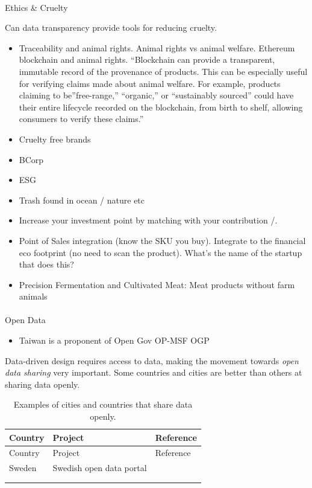\documentclass[
  letterpaper,
  DIV=11,
  numbers=noendperiod]{scrartcl}
\makeatletter
\let\oldparagraph\paragraph
\renewcommand{\paragraph}{
    \@ifstar
      \xxxParagraphStar
      \xxxParagraphNoStar
  }
\newcommand{\xxxParagraphStar}[1]{\oldparagraph*{#1}\mbox{}}
\newcommand{\xxxParagraphNoStar}[1]{\oldparagraph{#1}\mbox{}}
\providecommand{\tightlist}{%
  \setlength{\itemsep}{0pt}\setlength{\parskip}{0pt}}\usepackage{longtable,booktabs,array}
\makeatother
\begin{document}
\paragraph{Ethics \& Cruelty}\label{ethics-cruelty}

Can data transparency provide tools for reducing cruelty.

\begin{itemize}
\item
  Traceability and animal rights. Animal rights vs animal welfare.
  Ethereum blockchain and animal rights. ``Blockchain can provide a
  transparent, immutable record of the provenance of products. This can
  be especially useful for verifying claims made about animal welfare.
  For example, products claiming to be''free-range,'' ``organic,'' or
  ``sustainably sourced'' could have their entire lifecycle recorded on
  the blockchain, from birth to shelf, allowing consumers to verify
  these claims.''
\item
  Cruelty free brands
\item
  BCorp
\item
  ESG
\item
  Trash found in ocean / nature etc
\item
  Increase your investment point by matching with your contribution /.
\item
  Point of Sales integration (know the SKU you buy). Integrate to the
  financial eco footprint (no need to scan the product). What's the name
  of the startup that does this?
\item
  Precision Fermentation and Cultivated Meat: Meat products without farm
  animals
\end{itemize}

\paragraph{Open Data}\label{open-data}

\begin{itemize}
\tightlist
\item
  Taiwan is a proponent of Open Gov OP-MSF OGP
  \citep{opengovernmentpartnershipOGPParticipationCoCreation2021, labTaiwanTakesActions2021}
\end{itemize}

Data-driven design requires access to data, making the movement towards
\emph{open data sharing} very important. Some countries and cities are
better than others at sharing data openly.

\begin{longtable}[]{@{}lll@{}}
\caption{Examples of cities and countries that share data
openly.}\tabularnewline
\toprule\noalign{}
Country & Project & Reference \\
\midrule\noalign{}
\endfirsthead
\toprule\noalign{}
Country & Project & Reference \\
\midrule\noalign{}
\endhead
\bottomrule\noalign{}
\endlastfoot
Sweden & Swedish open data portal & \citet{SverigesDataportal} \\
& & \\
& & \\
\end{longtable}
\end{document}
